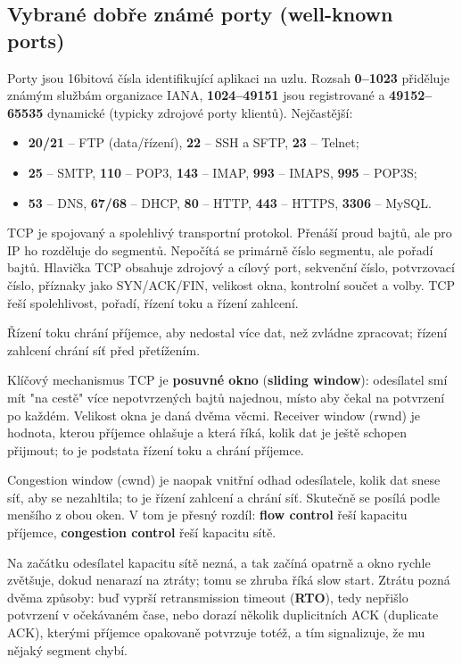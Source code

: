 \documentclass[11pt,a4paper]{article}
\begin{document}
\subsection*{Vybrané dobře známé porty (well-known ports)}
Porty jsou 16bitová čísla identifikující aplikaci na uzlu. Rozsah \textbf{0--1023} přiděluje známým službám organizace IANA, \textbf{1024--49151} jsou registrované a \textbf{49152--65535} dynamické (typicky zdrojové porty klientů). Nejčastější:
\begin{itemize}
  \item \textbf{20/21} -- FTP (data/řízení), \textbf{22} -- SSH a SFTP, \textbf{23} -- Telnet;
  \item \textbf{25} -- SMTP, \textbf{110} -- POP3, \textbf{143} -- IMAP, \textbf{993} -- IMAPS, \textbf{995} -- POP3S;
  \item \textbf{53} -- DNS, \textbf{67/68} -- DHCP, \textbf{80} -- HTTP, \textbf{443} -- HTTPS, \textbf{3306} -- MySQL.
\end{itemize}


TCP je spojovaný a spolehlivý transportní protokol. Přenáší proud bajtů, ale pro IP ho rozděluje do segmentů. Nepočítá se primárně číslo segmentu, ale pořadí bajtů. Hlavička TCP obsahuje zdrojový a cílový port, sekvenční číslo, potvrzovací číslo, příznaky jako SYN/ACK/FIN, velikost okna, kontrolní součet a volby. TCP řeší spolehlivost, pořadí, řízení toku a řízení zahlcení.

Řízení toku chrání příjemce, aby nedostal více dat, než zvládne zpracovat; řízení zahlcení chrání síť před přetížením.

Klíčový mechanismus TCP je \textbf{posuvné okno} (\textbf{sliding window}): odesílatel smí mít "na cestě" více nepotvrzených bajtů najednou, místo aby čekal na potvrzení po každém. Velikost okna je daná dvěma věcmi. Receiver window (rwnd) je hodnota, kterou příjemce ohlašuje a která říká, kolik dat je ještě schopen přijmout; to je podstata řízení toku a chrání příjemce.

Congestion window (cwnd) je naopak vnitřní odhad odesílatele, kolik dat snese síť, aby se nezahltila; to je řízení zahlcení a chrání síť. Skutečně se posílá podle menšího z obou oken. V tom je přesný rozdíl: \textbf{flow control} řeší kapacitu příjemce, \textbf{congestion control} řeší kapacitu sítě.

Na začátku odesílatel kapacitu sítě nezná, a tak začíná opatrně a okno rychle zvětšuje, dokud nenarazí na ztráty; tomu se zhruba říká slow start. Ztrátu pozná dvěma způsoby: buď vyprší retransmission timeout (\textbf{RTO}), tedy nepřišlo potvrzení v očekávaném čase, nebo dorazí několik duplicitních ACK (duplicate ACK), kterými příjemce opakovaně potvrzuje totéž, a tím signalizuje, že mu nějaký segment chybí.
\end{document}

